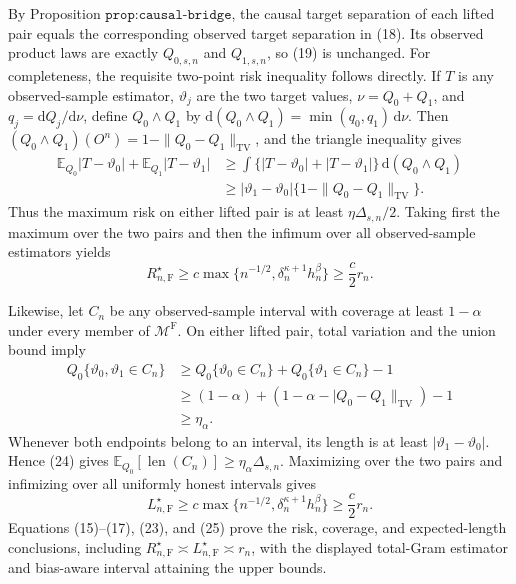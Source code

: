 By Proposition \(\texttt{prop:causal-bridge}\), the causal target separation of each lifted pair equals the corresponding observed target separation in (18).  Its observed product laws are exactly \(Q_{0,s,n}\) and \(Q_{1,s,n}\), so (19) is unchanged.  For completeness, the requisite two-point risk inequality follows directly.  If \(T\) is any observed-sample estimator, \(\vartheta_j\) are the two target values, \(\nu=Q_0+Q_1\), and \(q_j=\mathrm dQ_j/\mathrm d\nu\), define \(Q_0\wedge Q_1\) by \(\mathrm d(Q_0\wedge Q_1)=\min(q_0,q_1)\,\mathrm d\nu\).  Then \((Q_0\wedge Q_1)(O^n)=1-\|Q_0-Q_1\|_{\mathrm{TV}}\), and the triangle inequality gives
\[
\begin{aligned}
 \mathbb E_{Q_0}|T-\vartheta_0|+
 \mathbb E_{Q_1}|T-\vartheta_1|
 &\geq\int\{|T-\vartheta_0|+|T-\vartheta_1|\}\,\mathrm d(Q_0\wedge Q_1)\\
 &\geq |\vartheta_1-\vartheta_0|
 \{1-\|Q_0-Q_1\|_{\mathrm{TV}}\}.
\end{aligned}
\tag{22}
\]
Thus the maximum risk on either lifted pair is at least \(\eta\Delta_{s,n}/2\).  Taking first the maximum over the two pairs and then the infimum over all observed-sample estimators yields
\[
 R_{n,\mathrm F}^\star
 \geq c\max\{n^{-1/2},\delta_n^{\kappa+1}h_n^\beta\}
 \geq \frac c2 r_n.
 \tag{23}
\]

Likewise, let \(C_n\) be any observed-sample interval with coverage at least \(1-\alpha\) under every member of \(\mathcal M^{\mathrm F}\).  On either lifted pair, total variation and the union bound imply
\[
\begin{aligned}
 Q_0\{\vartheta_0,\vartheta_1\in C_n\}
 &\geq Q_0\{\vartheta_0\in C_n\}+Q_0\{\vartheta_1\in C_n\}-1\\
 &\geq (1-\alpha)+(1-\alpha-|Q_0-Q_1\|_{\mathrm{TV}})-1\\
 &\geq\eta_\alpha.
\end{aligned}
\tag{24}
\]
Whenever both endpoints belong to an interval, its length is at least \(|\vartheta_1-\vartheta_0|\).  Hence (24) gives \(\mathbb E_{Q_0}[\operatorname{len}(C_n)]\geq\eta_\alpha\Delta_{s,n}\).  Maximizing over the two pairs and infimizing over all uniformly honest intervals gives
\[
 L_{n,\mathrm F}^\star
 \geq c\max\{n^{-1/2},\delta_n^{\kappa+1}h_n^\beta\}
 \geq \frac c2 r_n.
 \tag{25}
\]
Equations (15)--(17), (23), and (25) prove the risk, coverage, and expected-length conclusions, including \(R_{n,\mathrm F}^\star\asymp L_{n,\mathrm F}^\star\asymp r_n\), with the displayed total-Gram estimator and bias-aware interval attaining the upper bounds.